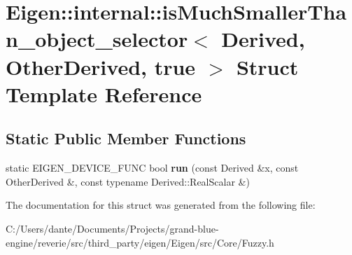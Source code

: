 \hypertarget{struct_eigen_1_1internal_1_1is_much_smaller_than__object__selector_3_01_derived_00_01_other_derived_00_01true_01_4}{}\section{Eigen\+::internal\+::is\+Much\+Smaller\+Than\+\_\+object\+\_\+selector$<$ Derived, Other\+Derived, true $>$ Struct Template Reference}
\label{struct_eigen_1_1internal_1_1is_much_smaller_than__object__selector_3_01_derived_00_01_other_derived_00_01true_01_4}
\subsection*{Static Public Member Functions}
\begin{DoxyCompactItemize}
\item 
\mbox{\label{struct_eigen_1_1internal_1_1is_much_smaller_than__object__selector_3_01_derived_00_01_other_derived_00_01true_01_4_a95e0de15531450f2a0b780af2782bacc}} 
static E\+I\+G\+E\+N\+\_\+\+D\+E\+V\+I\+C\+E\+\_\+\+F\+U\+NC bool {\bfseries run} (const Derived \&x, const Other\+Derived \&, const typename Derived\+::\+Real\+Scalar \&)
\end{DoxyCompactItemize}


The documentation for this struct was generated from the following file\+:\begin{DoxyCompactItemize}
\item 
C\+:/\+Users/dante/\+Documents/\+Projects/grand-\/blue-\/engine/reverie/src/third\+\_\+party/eigen/\+Eigen/src/\+Core/Fuzzy.\+h\end{DoxyCompactItemize}
